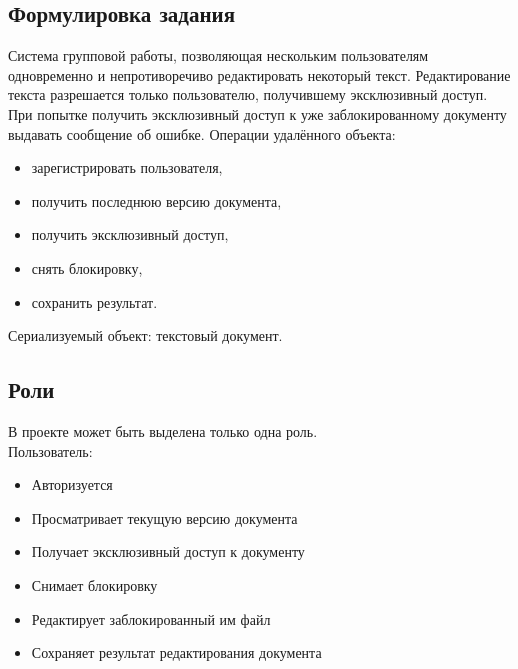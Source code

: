 \subsection{Формулировка задания}
Система групповой работы, позволяющая нескольким пользователям одновременно и непротиворечиво редактировать некоторый текст. Редактирование текста разрешается только пользователю, получившему эксклюзивный доступ. При попытке получить эксклюзивный доступ к уже
заблокированному документу выдавать сообщение об ошибке.
Операции удалённого объекта:
\begin{itemize}
	\item зарегистрировать пользователя,
	\item получить последнюю версию документа,
	\item получить эксклюзивный доступ,
	\item снять блокировку,
	\item сохранить результат.
\end{itemize}
Сериализуемый объект: текстовый документ. 

\subsection{Роли}
В проекте может быть выделена только одна роль.  \\
Пользователь:
	\begin{itemize}
		\item Авторизуется
		\item Просматривает текущую версию документа
		\item Получает эксклюзивный доступ к документу
		\item Снимает блокировку
		\item Редактирует заблокированный им файл
		\item Сохраняет результат редактирования документа
	\end{itemize}
